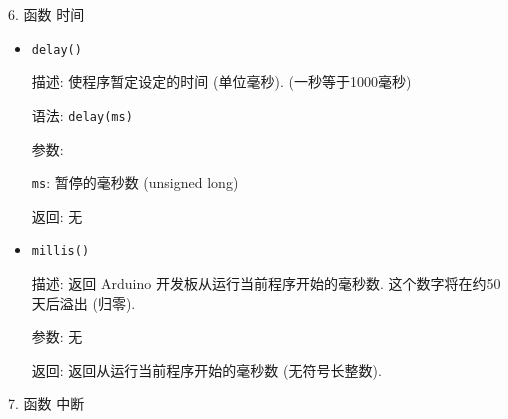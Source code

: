 \documentclass[openany, fontset=windowsold]{ctexbook}
\theoremstyle{kaiti}
\theoremstyle{normal}
\begin{document}
6. 函数 时间

\begin{itemize}
  \item \verb|delay()|

  描述: 使程序暂定设定的时间 (单位毫秒).  (一秒等于1000毫秒) 

  语法: \verb|delay(ms)|

  参数:

  \verb|ms|: 暂停的毫秒数 (unsigned long) 

  返回: 无

  \item \verb|millis()|

  描述: 返回 Arduino 开发板从运行当前程序开始的毫秒数. 这个数字将在约50天后溢出 (归零).

  参数: 无

  返回: 返回从运行当前程序开始的毫秒数 (无符号长整数).
\end{itemize}

7. 函数 中断
\end{document}
